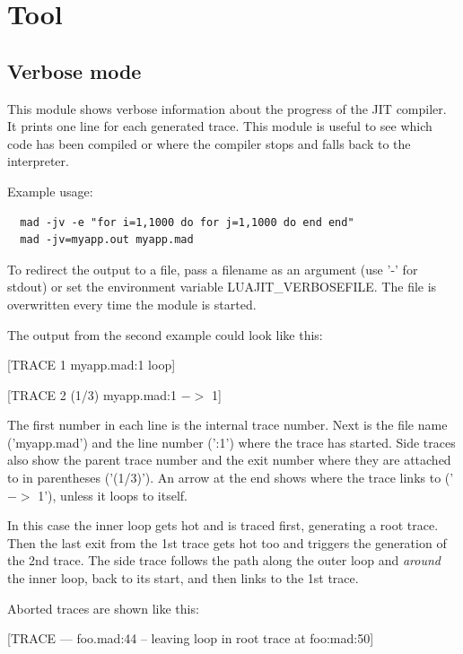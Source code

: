 \chapter{Tool}
\label{Chapt:Tool}


\section{Verbose mode}
\label{Sec:Verbose}

This module shows verbose information about the progress of the
JIT compiler. It prints one line for each generated trace. This module
is useful to see which code has been compiled or where the compiler
stops and falls back to the interpreter.

Example usage:

\begin{lstlisting}
  mad -jv -e "for i=1,1000 do for j=1,1000 do end end"
  mad -jv=myapp.out myapp.mad
\end{lstlisting}
To redirect the output to a file, pass a
filename as an argument (use '-' for stdout) or set the environment
variable LUAJIT\_VERBOSEFILE. The file is overwritten every time the
module is started.

The output from the second example could look like this:

\begin{center}
[TRACE   1 myapp.mad:1 loop]

[TRACE   2 (1/3) myapp.mad:1 $->$ 1]
\end{center}

The first number in each line is the internal trace number. Next is
the file name ('myapp.mad') and the line number (':1') where the
trace has started. Side traces also show the parent trace number and
the exit number where they are attached to in parentheses ('(1/3)').
An arrow at the end shows where the trace links to ('$->$ 1'), unless
it loops to itself.

In this case the inner loop gets hot and is traced first, generating
a root trace. Then the last exit from the 1st trace gets hot too
and triggers the generation of the 2nd trace. The side trace follows the
path along the outer loop and \textit{around} the inner loop, back to its
start, and then links to the 1st trace.

Aborted traces are shown like this:
\begin{center}
[TRACE --- foo.mad:44 -- leaving loop in root trace at foo:mad:50]
\end{center}

